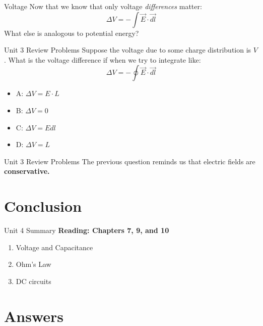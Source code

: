 \documentclass{beamer}
\begin{document}
\begin{frame}{Voltage}
Now that we know that only voltage \textit{differences} matter:
\begin{equation}
\Delta V = - \int \vec{E} \cdot \vec{dl}
\end{equation}
What else is analogous to potential energy?
\end{frame}

\begin{frame}{Unit 3 Review Problems}
Suppose the voltage due to some charge distribution is $V$.  What is the voltage difference if when we try to integrate like:
\begin{equation}
\Delta V = - \oint \vec{E} \cdot \vec{dl}
\end{equation}
\begin{itemize}
\item A: $\Delta V = E \cdot L$
\item B: $\Delta V = 0$
\item C: $\Delta V = E dl$
\item D: $\Delta V = L$
\end{itemize}
\end{frame}

\begin{frame}{Unit 3 Review Problems}
The previous question reminds us that electric fields are \textbf{conservative.}
\end{frame}

\section{Conclusion}

\begin{frame}{Unit 4 Summary}
\textbf{Reading: Chapters 7, 9, and 10}
\begin{enumerate}
\item Voltage and Capacitance
\item Ohm's Law
\item DC circuits
\end{enumerate}
\end{frame}

\section{Answers}
\end{document}
